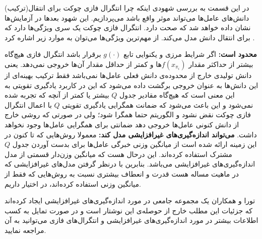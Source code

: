 در این قسمت به بررسی شهودی اینکه چرا انتگرال فازی چوکت برای انتقال(ترکیب) دانش‌های عامل‌ها می‌تواند موثر واقع باشد می‌پردازیم. این شهود بعدها در آزمایش‌ها نشان داده خواهد شد که صحت دارد. انتگرال فازی چوکت یک سری ویژگی‌ها دارد که برای انتقال دانش مدل می‌کند. از مهم‌ترین ویژگی‌ها می‌توان به موارد زیر اشاره کرد .
\begin{enumerate}
 \textbf{محدود است:} اگر شرایط مرزی و یکنوایی تابع $g(\cdot)$ برقرار باشد انتگرال‌ فازی هیچ‌گاه بیشتر از حداکثر مقدار $f(x_{\pi_i})$ها و کمتر از حداقل مقدار آن‌ها خروجی نمی‌دهد. یعنی دانش تولیدی خارج از محدوده‌ی دانش فعلی عامل‌ها نمی‌باشد فقط ترکیب بهینه‌ای از این دانش‌ها به عنوان خروجی برگشت داده می‌شود که این در کاربرد یادگیری تقویتی به این معنی است که هیچ‌گاه مقادیر جدول $Q$ بیشتر یا کمتر از آنچه که تجربه شده نمی‌شود و این باعث می‌شود که ضمانت همگرایی یادگیری تقویتی $Q$ با اعمال انتگرال فازی چوکت نقض نشود و الگوریتم حتما همگرا شود؛ ولی در صورتی که روشی خارج از دانش کنونی عامل‌ها خروجی دهد ضمانتی برای همگرایی عامل‌ها وجود نخواهد داشت.
 \textbf{می‌تواند اندازه‌گیری‌های غیرافزایشی مدل کند:} معمولا روش‌هایی که تا ‌کنون در این زمینه ارائه شده است از میانگین وزنی خبرگی عامل‌ها برای بدست آوردن جدول $Q$ مشترک استفاده کرده‌اند. این درحال هست که میانگین وزن‌دار قسمتی از مدل اندازه‌گیری‌های غیرافزایشی می‌باشد. بنابرین با درنظر گرفتن مدل‌های غیرافزایشی که در ماهیت مساله هست قدرت و انعطاف بیشتری نسبت به روش‌هایی که فقط از میانگین وزنی استفاده کرده‌اند، در اختیار داریم.
\end{enumerate}

تورا و همکاران یک مجموعه جامعی در مورد اندازه‌گیری‌های غیرافزایشی ایجاد کرده‌اند که جزئیات این مطلب خارج از حوصله‌ی این نوشتار است و در صورت تمایل به کسب اطلاعات بیشتر در مورد اندازه‌گیری‌های غیرافزایشی و انتگرال‌های فازی می‌توانید به آن مراجعه نمایید.
